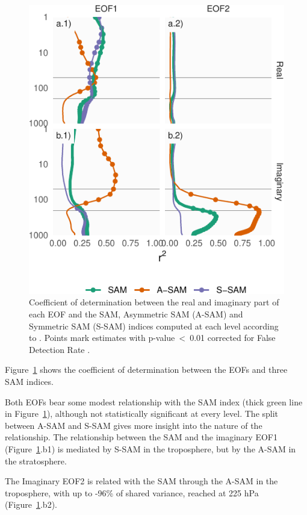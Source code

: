 \documentclass[smallextended]{svjour3}       %
\begin{document}
\begin{figure}
\centering
\includegraphics{../figures/sam-eof-vertical-1.pdf}
\caption{\label{fig:sam-eof-vertical}Coefficient of determination between the real and imaginary part of each EOF and the SAM, Asymmetric SAM (A-SAM) and Symmetric SAM (S-SAM) indices computed at each level according to \citet{campitelli2021}. Points mark estimates with p-value~\textless~0.01 corrected for False Detection Rate \citep{benjamini1995}.}
\end{figure}

Figure~\ref{fig:sam-eof-vertical} shows the coefficient of determination between the EOFs and three SAM indices.

Both EOFs bear some modest relationship with the SAM index (thick green line in Figure~\ref{fig:sam-eof-vertical}), although not statistically significant at every level. The split between A-SAM and S-SAM gives more insight into the nature of the relationship. The relationship between the SAM and the imaginary EOF1 (Figure~\ref{fig:sam-eof-vertical}.b1) is mediated by S-SAM in the troposphere, but by the A-SAM in the stratosphere.

The Imaginary EOF2 is related with the SAM through the A-SAM in the troposphere, with up to -96\% of shared variance, reached at 225 hPa (Figure~\ref{fig:sam-eof-vertical}.b2).
\end{document}
